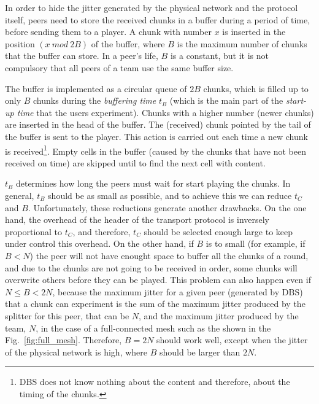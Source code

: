 
\label{sec:buffering_chunks}

In order to hide the jitter generated by the physical network and the
protocol itself, peers need to store the received chunks in a buffer
during a period of time, before sending them to a player. A chunk with
number $x$ is inserted in the position $(x~\mathit{mod}~2B)$ of the
buffer, where $B$ is the maximum number of chunks that the buffer can
store. In a peer's life, $B$ is a constant, but it is not compulsory
that all peers of a team use the same buffer size.

The buffer is implemented as a circular queue of $2B$ chunks, which is
filled up to only $B$ chunks during the \emph{buffering time} $t_B$
(which is the main part of the \emph{start-up time} that the users
experiment). Chunks with a higher number (newer chunks) are inserted
in the head of the buffer. The (received) chunk pointed by the tail of
the buffer is sent to the player. This action is carried out each time
a new chunk is received\footnote{DBS does not know nothing about the
  content and therefore, about the timing of the chunks.}. Empty cells
in the buffer (caused by the chunks that have not been received on
time) are skipped until to find the next cell with content.

$t_B$ determines how long the peers must wait for start playing the
chunks. In general, $t_B$ should be as small as possible, and to
achieve this we can reduce $t_C$ and $B$. Unfortunately, these
reductions generate another drawbacks. On the one hand, the overhead
of the header of the transport protocol is inversely proportional to
$t_C$, and therefore, $t_C$ should be selected enough large to keep
under control this overhead. On the other hand, if $B$ is to small
(for example, if $B<N$) the peer will not have enought space to buffer
all the chunks of a round, and due to the chunks are not going to be
received in order, some chunks will overwrite others before they can
be played. This problem can also happen even if $N\leq B<2N$, because
the maximum jitter for a given peer (generated by DBS) that a chunk
can experiment is the sum of the maximum jitter produced by the
splitter for this peer, that can be $N$, and the maximum jitter
produced by the team, $N$, in the case of a full-connected mesh such
as the shown in the Fig.~\ref{fig:full_mesh}. Therefore, $B=2N$ should
work well, except when the jitter of the physical network is high,
where $B$ should be larger than $2N$.

